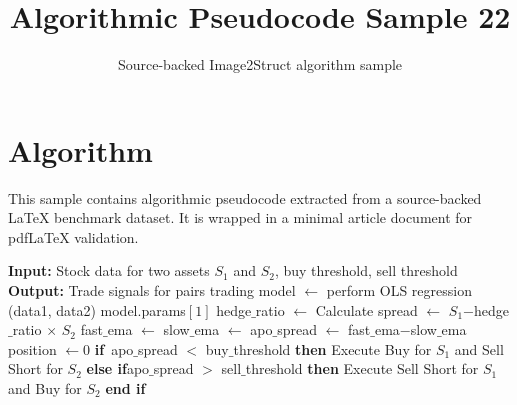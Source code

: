\documentclass[11pt]{article}
\title{Algorithmic Pseudocode Sample 22}
\author{Source-backed Image2Struct algorithm sample}
\date{}
\begin{document}
\maketitle
\section{Algorithm}
This sample contains algorithmic pseudocode extracted from a source-backed LaTeX benchmark dataset. It is wrapped in a minimal article document for pdfLaTeX validation.

\begin{algorithm}[htbp]
\caption{Source-backed algorithmic procedure}
\begin{algorithm}
[H]
\caption{APO Spread Trading Strategy Algorithm}\begin{algorithmic}[1]
\State \textbf{Input:} Stock data for two assets $S_1$ and $S_2$, buy threshold, sell threshold
\State \textbf{Output:} Trade signals for pairs trading
\State
{}
\State model $\gets$ perform OLS regression (data1, data2)
\State \Return model.params$[1]$
\EndProcedure
\State
{}
\State hedge$\_$ratio $\gets$ 
\State Calculate spread $\gets$ $S_1$$-$hedge$\_$ratio $\times$ $S_2$
\State fast$\_$ema $\gets$ 
\State slow$\_$ema $\gets$ 
\State apo$\_$spread $\gets$ fast$\_$ema$-$slow$\_$ema
\State position $\gets 0$
\EndProcedure
\State
{}
\State \textbf{if}{~apo$\_$spread $<$ buy$\_$threshold} \textbf{then}
\State \hspace{1cm} Execute Buy for $S_1$ and Sell Short for $S_2$
\State \textbf{else if}{apo$\_$spread $>$ sell$\_$threshold} \textbf{then}
\State \hspace{1cm} Execute Sell Short for $S_1$ and Buy for $S_2$
\State \textbf{end if}
\EndProcedure
\end{algorithmic}
\end{algorithm}
\end{algorithm}
\end{document}
